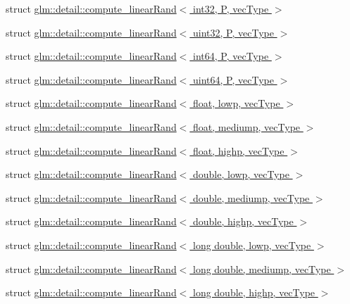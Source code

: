 \begin{DoxyCompactItemize}
\item 
struct \hyperlink{structglm_1_1detail_1_1compute__linearRand_3_01int32_00_01P_00_01vecType_01_4}{glm\-::detail\-::compute\-\_\-linear\-Rand$<$ int32, P, vec\-Type $>$}
\item 
struct \hyperlink{structglm_1_1detail_1_1compute__linearRand_3_01uint32_00_01P_00_01vecType_01_4}{glm\-::detail\-::compute\-\_\-linear\-Rand$<$ uint32, P, vec\-Type $>$}
\item 
struct \hyperlink{structglm_1_1detail_1_1compute__linearRand_3_01int64_00_01P_00_01vecType_01_4}{glm\-::detail\-::compute\-\_\-linear\-Rand$<$ int64, P, vec\-Type $>$}
\item 
struct \hyperlink{structglm_1_1detail_1_1compute__linearRand_3_01uint64_00_01P_00_01vecType_01_4}{glm\-::detail\-::compute\-\_\-linear\-Rand$<$ uint64, P, vec\-Type $>$}
\item 
struct \hyperlink{structglm_1_1detail_1_1compute__linearRand_3_01float_00_01lowp_00_01vecType_01_4}{glm\-::detail\-::compute\-\_\-linear\-Rand$<$ float, lowp, vec\-Type $>$}
\item 
struct \hyperlink{structglm_1_1detail_1_1compute__linearRand_3_01float_00_01mediump_00_01vecType_01_4}{glm\-::detail\-::compute\-\_\-linear\-Rand$<$ float, mediump, vec\-Type $>$}
\item 
struct \hyperlink{structglm_1_1detail_1_1compute__linearRand_3_01float_00_01highp_00_01vecType_01_4}{glm\-::detail\-::compute\-\_\-linear\-Rand$<$ float, highp, vec\-Type $>$}
\item 
struct \hyperlink{structglm_1_1detail_1_1compute__linearRand_3_01double_00_01lowp_00_01vecType_01_4}{glm\-::detail\-::compute\-\_\-linear\-Rand$<$ double, lowp, vec\-Type $>$}
\item 
struct \hyperlink{structglm_1_1detail_1_1compute__linearRand_3_01double_00_01mediump_00_01vecType_01_4}{glm\-::detail\-::compute\-\_\-linear\-Rand$<$ double, mediump, vec\-Type $>$}
\item 
struct \hyperlink{structglm_1_1detail_1_1compute__linearRand_3_01double_00_01highp_00_01vecType_01_4}{glm\-::detail\-::compute\-\_\-linear\-Rand$<$ double, highp, vec\-Type $>$}
\item 
struct \hyperlink{structglm_1_1detail_1_1compute__linearRand_3_01long_01double_00_01lowp_00_01vecType_01_4}{glm\-::detail\-::compute\-\_\-linear\-Rand$<$ long double, lowp, vec\-Type $>$}
\item 
struct \hyperlink{structglm_1_1detail_1_1compute__linearRand_3_01long_01double_00_01mediump_00_01vecType_01_4}{glm\-::detail\-::compute\-\_\-linear\-Rand$<$ long double, mediump, vec\-Type $>$}
\item 
struct \hyperlink{structglm_1_1detail_1_1compute__linearRand_3_01long_01double_00_01highp_00_01vecType_01_4}{glm\-::detail\-::compute\-\_\-linear\-Rand$<$ long double, highp, vec\-Type $>$}
\end{DoxyCompactItemize}
